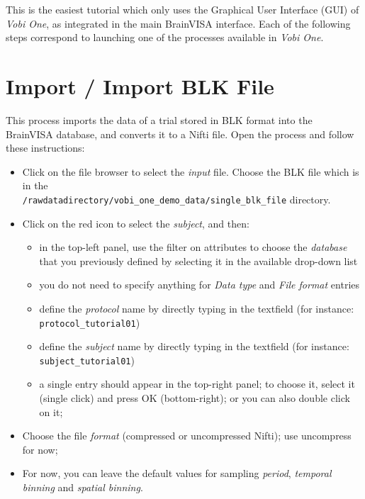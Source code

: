This is the easiest tutorial which only uses the Graphical User Interface (GUI) of {\em Vobi One}, as integrated in the main BrainVISA interface. Each of the following steps correspond to launching one of the processes available in {\em Vobi One}.


\section{Import / Import BLK File}

This process imports the data of a trial stored in BLK format into the BrainVISA database, and converts it to a Nifti file. Open the process and follow these instructions:

\begin{itemize}
  \item Click on the file browser to select the \textit{input} file. Choose the BLK file which is in the \\
    \texttt{/rawdatadirectory/vobi\_one\_demo\_data/single\_blk\_file} directory.
  \item Click on the red icon to select the \textit{subject}, and then:
    \begin{itemize}
      \item in the top-left panel, use the filter on attributes to choose the \textit{database} that you previously defined by selecting it in the available drop-down list
      \item you do not need to specify anything for \textit{Data type} and \textit{File format} entries
      \item define the \textit{protocol} name by directly typing in the textfield (for instance: \texttt{protocol\_tutorial01})
      \item define the \textit{subject} name by directly typing in the textfield (for instance: \texttt{subject\_tutorial01})
      \item a single entry should appear in the top-right panel; to choose it, select it (single click) and press OK (bottom-right); or you can also double click on it;
    \end{itemize}
  \item Choose the file \textit{format} (compressed or uncompressed Nifti); use uncompress for now;
  \item For now, you can leave the default values for sampling \textit{period}, \textit{temporal binning} and \textit{spatial binning}.
\end{itemize}

